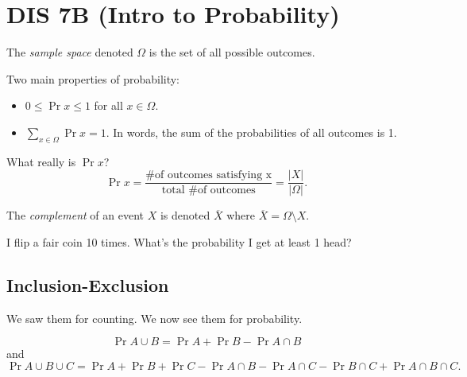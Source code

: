 \section{DIS 7B (Intro to Probability)}


\begin{definition}
    The \textit{sample space} denoted $\Omega$ is the set of all possible outcomes. 
\end{definition}

Two main properties of probability:
\begin{itemize}
    \item $0 \le \Pr{x} \le 1$ for all $x \in \Omega$.
    \item $\sum_{x \in \Omega} \Pr{x} = 1$. In words, the sum of the probabilities of all outcomes is 1. 
\end{itemize}

What really is $\Pr{x}$? 
\[ \Pr{x} = \frac{\text{\# of outcomes satisfying x}}{\text{total \# of outcomes}} = \frac{|X|}{|\Omega|}. \]

\begin{definition}[Complement]
    The \textit{complement} of an event $X$ is denoted $\overline{X}$ where $\overline{X} = \Omega \setminus X$. 
\end{definition}

\begin{example}
    I flip a fair coin 10 times. What's the probability I get at least 1 head? 
\end{example}

\subsection{Inclusion-Exclusion}

We saw them for counting. We now see them for probability. 

\[ \Pr{A \cup B} = \Pr{A} + \Pr{B} - \Pr{A \cap B} \] and \[ \Pr{A \cup B \cup C} = \Pr{A} + \Pr{B} + \Pr{C} - \Pr{A \cap B} - \Pr{A \cap C} - \Pr{B \cap C} + \Pr{A \cap B \cap C}. \]